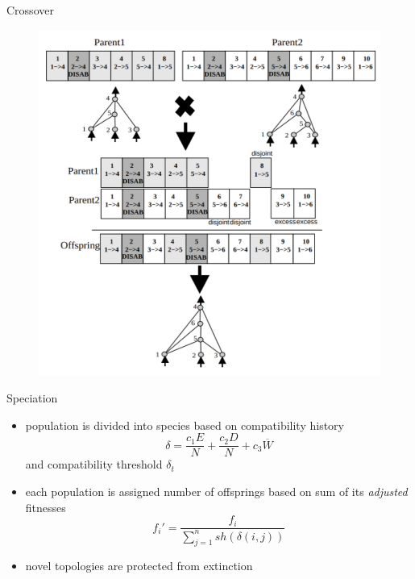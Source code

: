 \documentclass{beamer}
\begin{document}
\begin{frame}{Crossover}
    \begin{figure}[c]
        \includegraphics[scale=0.2]{img/crossover.png}
    \end{figure}
\end{frame}
\begin{frame}{Speciation}
    \begin{itemize}
        \item population is divided into species based on compatibility history \begin{equation*}
                  \delta = \frac{c_1E}{N}+\frac{c_2D}{N}+c_3 \overline{W}
              \end{equation*} and compatibility threshold $\delta_t$
        \item each population is assigned number of offsprings based on sum of its \emph{adjusted} fitnesses
              \begin{equation*}
                  f_i' =\frac{f_i}{\sum_{j=1}^n sh(\delta(i,j))}
              \end{equation*}
        \item novel topologies are protected from extinction
    \end{itemize}
\end{frame}
\end{document}
